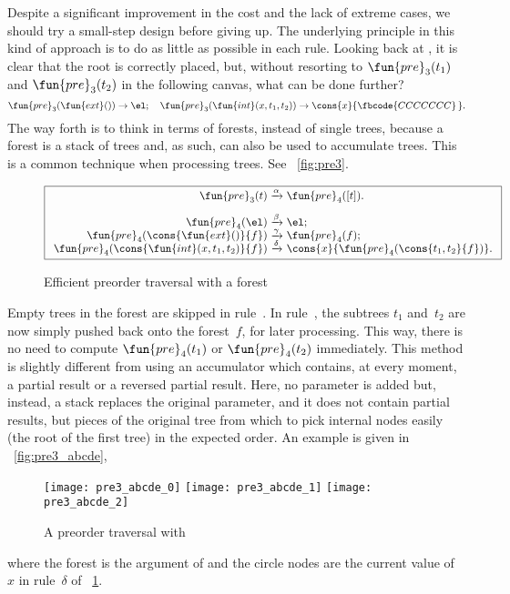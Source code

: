Despite a significant improvement in the cost and the lack of extreme
cases, we should try a small\hyp{}step design before giving up. The underlying principle in this kind of
approach is to do as little as possible in each rule. Looking back at
, it is clear that the
root is correctly placed, but, without resorting to
\(\fun{pre}_3(t_1)\) and
\(\fun{pre}_3(t_2)\) in the following canvas, what can be done
further?
\begin{equation*}
\fun{pre}_3(\fun{ext}()) \rightarrow \el;
\quad
\fun{pre}_3(\fun{int}(x,t_1,t_2)) \rightarrow
  \cons{x}{\fbcode{CCCCCCC}\,}.
\end{equation*}
The way forth is to think in terms of forests,
instead of single trees, because a forest is a stack of trees and, as
such, can also be used to accumulate trees. This is a common technique when processing
trees. See \fig~\vref{fig:pre3}.
\begin{figure}
\begin{equation*}
\boxed{
\begin{array}{r@{\;}c@{\;}l}
\fun{pre}_3(t) & \xrightarrow{\smash{\alpha}} & \fun{pre}_4([t]).\\
\\
\fun{pre}_4(\el) & \xrightarrow{\smash{\beta}} & \el;\\
\fun{pre}_4(\cons{\fun{ext}()}{f})
  & \xrightarrow{\smash{\gamma}} & \fun{pre}_4(f);\\
\fun{pre}_4(\cons{\fun{int}(x,t_1,t_2)}{f})
  & \xrightarrow{\smash{\delta}} &
  \cons{x}{\fun{pre}_4(\cons{t_1,t_2}{f})}.
\end{array}}
\end{equation*}
\caption{Efficient preorder traversal with a forest}
\label{fig:pre3}
\end{figure}
Empty trees in the forest are skipped in rule~\clause{\gamma}. In
rule~\clause{\delta}, the subtrees \(t_1\) and~\(t_2\) are now simply
pushed back onto the forest~\(f\), for later processing. This way,
there is no need to compute
\(\fun{pre}_4(t_1)\) or
\(\fun{pre}_4(t_2)\) immediately. This method is slightly different
from using an accumulator which contains, at every moment, a partial
result or a reversed partial result. Here, no parameter is added but,
instead, a stack replaces the original parameter, and it does not
contain partial results, but pieces of the original tree from which to
pick internal nodes easily (the root of the first tree) in the
expected order. An example is given in \fig~\vref{fig:pre3_abcde},
\begin{figure}[!b]
\centering
\texttt{[image: pre3\_abcde\_0]} %
\texttt{[image: pre3\_abcde\_1]}
\texttt{[image: pre3\_abcde\_2]}
\caption{A preorder traversal with }
\label{fig:pre3_abcde}
\end{figure}
where the forest is the argument of  and the circle
nodes are the current value of~\(x\) in rule~\(\delta\) of
\fig~\ref{fig:pre3}.

